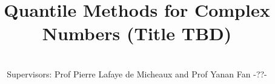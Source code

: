 \documentclass[honours,12pt]{UNSWthesis}
\title{Quantile Methods for Complex Numbers (Title TBD)}
\author{\Authornameonly\\{\bigskip}Supervisors: Prof Pierre Lafaye de Micheaux and Prof Yanan Fan -??-}
\numberwithin{equation}{section}
\begin{document}
\beforepreface






\afterpreface




\end{document}
